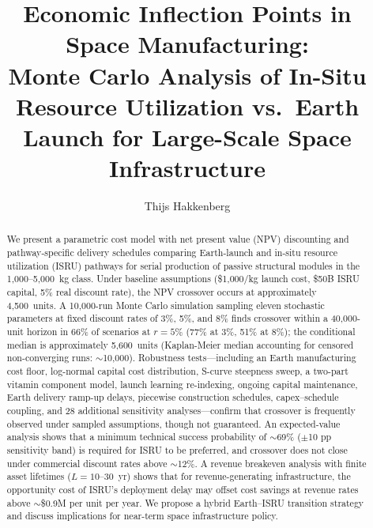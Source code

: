 \documentclass[preprint,12pt]{elsarticle}
\begin{document}
\begin{frontmatter}

\title{Economic Inflection Points in Space Manufacturing:\\ Monte Carlo Analysis of In-Situ Resource Utilization vs.\ Earth Launch for Large-Scale Space Infrastructure}

\author[dyson]{Thijs Hakkenberg}

\address[dyson]{Project Dyson, Open Research Initiative}

\begin{abstract}
We present a parametric cost model with net present value (NPV) discounting and pathway-specific delivery schedules comparing Earth-launch and in-situ resource utilization (ISRU) pathways for serial production of passive structural modules in the 1{,}000--5{,}000~kg class. Under baseline assumptions (\$1{,}000/kg launch cost, \$50B ISRU capital, 5\% real discount rate), the NPV crossover occurs at approximately 4{,}500~units. A 10{,}000-run Monte Carlo simulation sampling eleven stochastic parameters at fixed discount rates of 3\%, 5\%, and 8\% finds crossover within a 40{,}000-unit horizon in 66\% of scenarios at $r = 5\%$ (77\% at 3\%, 51\% at 8\%); the conditional median is approximately 5{,}600~units (Kaplan-Meier median accounting for censored non-converging runs: $\sim$10{,}000). Robustness tests---including an Earth manufacturing cost floor, log-normal capital cost distribution, S-curve steepness sweep, a two-part vitamin component model, launch learning re-indexing, ongoing capital maintenance, Earth delivery ramp-up delays, piecewise construction schedules, capex--schedule coupling, and 28 additional sensitivity analyses---confirm that crossover is frequently observed under sampled assumptions, though not guaranteed. An expected-value analysis shows that a minimum technical success probability of $\sim$69\% ($\pm$10 pp sensitivity band) is required for ISRU to be preferred, and crossover does not close under commercial discount rates above $\sim$12\%. A revenue breakeven analysis with finite asset lifetimes ($L = 10$--$30$~yr) shows that for revenue-generating infrastructure, the opportunity cost of ISRU's deployment delay may offset cost savings at revenue rates above $\sim$\$0.9M per unit per year. We propose a hybrid Earth--ISRU transition strategy and discuss implications for near-term space infrastructure policy.
\end{abstract}


\end{frontmatter}
\end{document}
